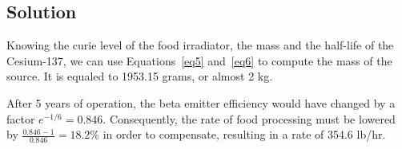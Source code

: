 \subsection{Solution}

Knowing the curie level of the food irradiator, the mass and the half-life of the Cesium-137, we can use Equations~\ref{eq5} and~\ref{eq6} to compute the mass of the source. It is equaled to 1953.15 grams, or almost 2 kg.

After 5 years of operation, the beta emitter efficiency would have changed by a factor $e^{-1/6} = 0.846$. Consequently, the rate of food processing must be lowered by $\frac{0.846 - 1}{0.846} = 18.2\%$ in order to compensate, resulting in a rate of 354.6 lb/hr.




